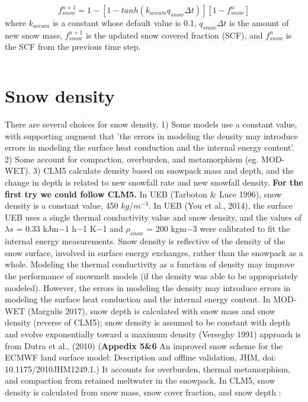 \documentclass{article}
\begin{document}
\begin{equation}
f_{snow}^{n+1} = 1-[1-tanh(k_{accum}q_{snow}\Delta t)][1-f_{snow}^{n}]
\end{equation}where $k_{accum}$ is a constant whose default value is 0.1, $q_{snow}\Delta t$ is the amount of new snow mass, $f_{snow}^{n+1}$ is the updated snow covered fraction (SCF), and $f_{snow}^{n}$ is the SCF from the previous time step.

\begin{equation}
\end{equation}

\section{Snow density}
There are several choices for snow density. 1) Some models use a constant value, with supporting augment that 'the errors in modeling the density may introduce errors in modeling the surface heat conduction and the internal energy content'. 2) Some account for compaction, overburden, and metamorphism (eg. MOD-WET). 3) CLM5 calculate density based on snowpack mass and depth, and the change in depth is related to new snowfall rate and new snowfall density.
\textbf{For the first try we could follow CLM5.}
In UEB (Tarboton & Luce 1996), snow density is a constant value, 450 $kg/m^{-3}$.
In UEB (You et al., 2014), the surface UEB uses a single thermal conductivity value and snow density, and the values of $\lambda s$ = 0.33 kJm−1 h−1 K−1 and $\rho_{snow}$ = 200 kgm−3 were calibrated to fit the internal energy measurements. Snow density is reflective of the density of the snow surface, involved in surface energy exchanges, rather than the snowpack as a whole. Modeling the thermal conductivity as a function of density may improve the performance of snowmelt models (if the density was able to be appropriately modeled). However, the errors in modeling the density may introduce errors in modeling the surface heat conduction and the internal energy content.
In MOD-WET (Margulis 2017), snow depth is calculated with snow mass and snow density (reverse of CLM5); snow density is assumed to be constant with depth and evolve exponentially toward a maximum density (Verseghy 1991) approach is from Dutra et al., (2010) (\textbf{Appedix 5&6} An improved snow scheme for the ECMWF land surface model: Description and offline validation, JHM, doi: 10.1175/2010JHM1249.1.) It accounts for overburden, thermal metamorphism, and compaction from retained meltwater in the snowpack.
In CLM5, snow density is calculated from snow mass, snow cover fraction, and snow depth :
\end{document}
